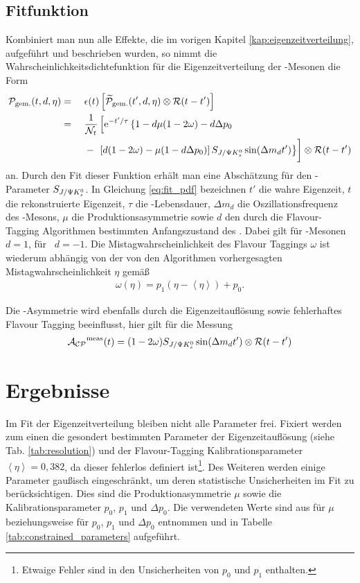 \subsection{Fitfunktion}
Kombiniert man nun alle Effekte, die im vorigen Kapitel \ref{kap:eigenzeitverteilung}, aufgeführt und beschrieben wurden, so nimmt die Wahrscheinlichkeitsdichtefunktion für die Eigenzeitverteilung der \Bd-Mesonen die Form
\begin{alignat}{3}
\nonumber\mathcal{P}_{\text{gem.}}(t, d, \eta) &=\  &&  \epsilon(t)\left[\widetilde{\mathcal{P}}_{\text{gem.}}(t', d, \eta) \otimes \mathcal{R}(t-t')\right]\\
\nonumber &= &&\frac{1}{\mathcal{N}_t}\left[\e^{-t'/\tau} \left\lbrace 1-d\mu(1-2\omega)-d\Delta p_0 \right.\right.\\
& &&-\left.\vphantom{\frac{1}{\mathcal{N}_t}}\left.\left[d(1-2\omega)-\mu(1-d\Delta p_0)\right]\SJPsi\sin(\Delta m_d t')\right\rbrace\right]\otimes\mathcal{R}(t-t') \label{eq:fit_pdf}
\end{alignat}
an. Durch den Fit dieser Funktion erhält man eine Abschätzung für den \CP-Parameter $S_{J/\Psi K_s^0}$. In Gleichung \ref{eq:fit_pdf} bezeichnen $t'$ die wahre Eigenzeit, $t$ die rekonstruierte Eigenzeit, $\tau$ die \Bd-Lebensdauer, $\Delta m_d$ die Oszillationsfrequenz des \Bd-Mesons, $\mu$ die Produktionsasymmetrie sowie $d$ den durch die Flavour-Tagging Algorithmen bestimmten Anfangszustand des \Bd. Dabei gilt für \Bd-Mesonen $d=1$, für \Bdbar\ $d=-1$. Die Mistagwahrscheinlichkeit des Flavour Taggings $\omega$ ist wiederum abhängig von der von den Algorithmen vorhergesagten Mistagwahrscheinlichkeit $\eta$ gemäß
\begin{align}
\omega(\eta) = p_1\left(\eta-\left\langle\eta\right\rangle\right) + p_0.
\end{align}

Die \CP-Asymmetrie wird ebenfalls durch die Eigenzeitauflösung sowie fehlerhaftes Flavour Tagging beeinflusst, hier gilt für die Messung \cite{lhcb-paper}
\begin{align}
\mathcal{A_{CP}}^{\text{meas}}(t) = (1-2\omega)S_{J/\Psi K_s^0} \sin(\Delta m_d t') \otimes \mathcal{R}(t-t') \label{eq:cp_asymm_meas}
\end{align}


\section{Ergebnisse} \label{kap:fitergebnis}
Im Fit der Eigenzeitverteilung bleiben nicht alle Parameter frei. Fixiert werden zum einen die gesondert bestimmten Parameter der Eigenzeitauflösung (siehe Tab. \ref{tab:resolution}) und der Flavour-Tagging Kalibrationsparameter $\left\langle\eta\right\rangle = 0,382$, da dieser fehlerlos definiert ist\footnote{Etwaige Fehler sind in den Unsicherheiten von $p_0$ und $p_1$ enthalten.}. Des Weiteren werden einige Parameter gaußisch eingeschränkt, um deren statistische Unsicherheiten im Fit zu berücksichtigen. Dies sind die Produktionasymmetrie $\mu$ sowie die Kalibrationsparameter $p_0$, $p_1$ und $\Delta p_0$. Die verwendeten Werte sind aus \cite{lhcb-paper} für $\mu$ beziehungsweise \cite{tagging} für $p_0$, $p_1$ und $\Delta p_0$ entnommen und in Tabelle \ref{tab:constrained_parameters} aufgeführt.

